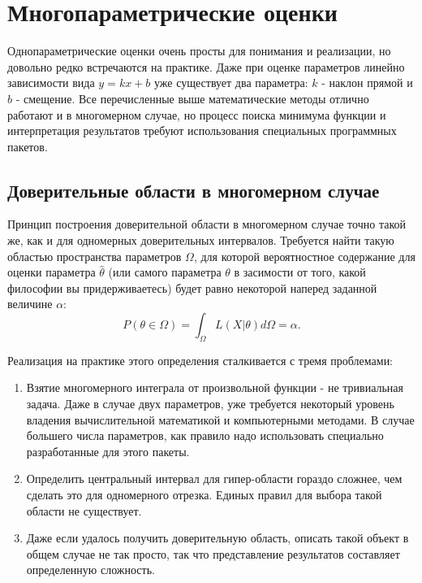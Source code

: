 
\section{Многопараметрические оценки}

    Однопараметрические оценки очень просты для понимания и реализации, но
довольно редко встречаются на практике. Даже при оценке параметров
линейно зависимости вида $y = k x + b$ уже существует два параметра:
$k$ - наклон прямой и $b$ - смещение. Все перечисленные выше
математические методы отлично работают и в многомерном случае, но
процесс поиска минимума функции и интерпретация результатов требуют использования специальных
программных пакетов.

\subsection{Доверительные области в многомерном случае}

    Принцип построения доверительной области в многомерном случае точно
такой же, как и для одномерных доверительных интервалов. Требуется найти
такую областью пространства параметров $\Omega$, для которой
вероятностное содержание для оценки параметра $\hat \theta$ (или
самого параметра $\theta$ в засимости от того, какой философии вы
придерживаетесь) будет равно некоторой наперед заданной величине
$\alpha$:
\begin{equation}
P(\theta \in \Omega) = \int_\Omega{L(X | \theta)}d\Omega = \alpha.
\end{equation}

Реализация на практике этого определения сталкивается с тремя
проблемами:

\begin{enumerate}
\item Взятие многомерного интеграла от произвольной функции - не тривиальная
  задача. Даже в случае двух параметров, уже требуется некоторый уровень
  владения вычислительной математикой и компьютерными методами. В случае
  большего числа параметров, как правило надо использовать специально
  разработанные для этого пакеты.
\item Определить центральный интервал для гипер-области гораздо сложнее, чем
  сделать это для одномерного отрезка. Единых правил для выбора такой
  области не существует.
\item Даже если удалось получить доверительную область, описать такой объект
  в общем случае не так просто, так что представление результатов
  составляет определенную сложность.
\end{enumerate}

